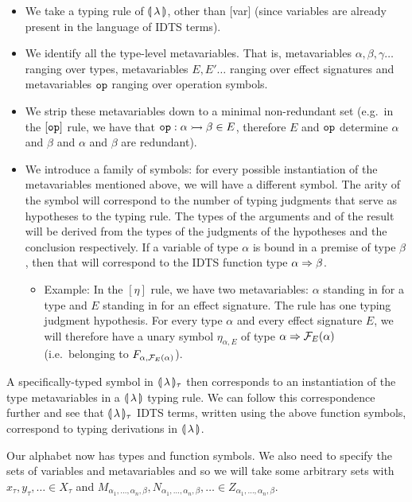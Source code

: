 \begin{itemize}
\item We take a typing rule of $\llparenthesis \, \lambda \, \rrparenthesis$, other than [var] (since
  variables are already present in the language of IDTS terms).
\item We identify all the type-level metavariables. That is, metavariables
  $\alpha, \beta, \gamma \ldots$ ranging over types, metavariables
  $E, E' \ldots$ ranging over effect signatures and metavariables $\mathtt{op}$
  ranging over operation symbols.
\item We strip these metavariables down to a minimal non-redundant set
  (e.g.\ in the $[\mathtt{op}]$ rule, we have that
  $\mathtt{op} : \alpha \rightarrowtail \beta \in E$, therefore $E$ and $\mathtt{op}$
  determine $\alpha$ and $\beta$ and $\alpha$ and $\beta$ are redundant).
\item We introduce a family of symbols: for every possible instantiation of
  the metavariables mentioned above, we will have a different symbol. The
  arity of the symbol will correspond to the number of typing judgments
  that serve as hypotheses to the typing rule. The types of the arguments
  and of the result will be derived from the types of the judgments of the
  hypotheses and the conclusion respectively. If a variable of type
  $\alpha$ is bound in a premise of type $\beta$, then that will correspond
  to the IDTS function type $\alpha \Rightarrow \beta$.
  \begin{itemize}
  \item Example: In the $[\eta]$ rule, we have two metavariables: $\alpha$
    standing in for a type and $E$ standing in for an effect signature. The
    rule has one typing judgment hypothesis. For every type $\alpha$ and
    every effect signature $E$, we will therefore have a unary symbol
    $\eta_{\alpha, E}$ of type $\alpha \Rightarrow \mathcal{F}_E(\alpha)$ (i.e.\ belonging
    to $F_{\alpha, \mathcal{F}_E(\alpha)}$).
  \end{itemize}
\end{itemize}

A specifically-typed symbol in
$\llparenthesis \, \lambda \, \rrparenthesis_\tau$ then corresponds to an instantiation of the type
metavariables in a
$\llparenthesis \, \lambda \, \rrparenthesis$ typing rule. We can follow this correspondence further
and see that
$\llparenthesis \, \lambda \, \rrparenthesis_\tau$ IDTS terms, written using the above function
symbols, correspond to typing derivations in $\llparenthesis \, \lambda \, \rrparenthesis$.

Our alphabet now has types and function symbols. We also need to specify
the sets of variables and metavariables and so we will take some arbitrary
sets with $x_\tau, y_\tau, \ldots \in X_\tau$ and
$M_{\alpha_1,\ldots,\alpha_n,\beta}, N_{\alpha_1,\ldots,\alpha_n,\beta},
\ldots \in Z_{\alpha_1,\ldots,\alpha_n,\beta}$.


